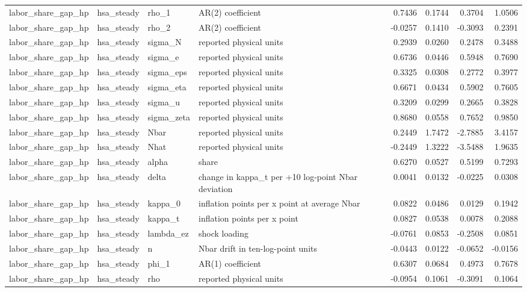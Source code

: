 \begin{tabular}{llllrrrr}
labor\_share\_gap\_hp & hsa\_steady & rho\_1 & AR(2) coefficient & 0.7436 & 0.1744 & 0.3704 & 1.0506 \\
labor\_share\_gap\_hp & hsa\_steady & rho\_2 & AR(2) coefficient & -0.0257 & 0.1410 & -0.3093 & 0.2391 \\
labor\_share\_gap\_hp & hsa\_steady & sigma\_N & reported physical units & 0.2939 & 0.0260 & 0.2478 & 0.3488 \\
labor\_share\_gap\_hp & hsa\_steady & sigma\_e & reported physical units & 0.6736 & 0.0446 & 0.5948 & 0.7690 \\
labor\_share\_gap\_hp & hsa\_steady & sigma\_eps & reported physical units & 0.3325 & 0.0308 & 0.2772 & 0.3977 \\
labor\_share\_gap\_hp & hsa\_steady & sigma\_eta & reported physical units & 0.6671 & 0.0434 & 0.5902 & 0.7605 \\
labor\_share\_gap\_hp & hsa\_steady & sigma\_u & reported physical units & 0.3209 & 0.0299 & 0.2665 & 0.3828 \\
labor\_share\_gap\_hp & hsa\_steady & sigma\_zeta & reported physical units & 0.8680 & 0.0558 & 0.7652 & 0.9850 \\
labor\_share\_gap\_hp & hsa\_steady & Nbar & reported physical units & 0.2449 & 1.7472 & -2.7885 & 3.4157 \\
labor\_share\_gap\_hp & hsa\_steady & Nhat & reported physical units & -0.2449 & 1.3222 & -3.5488 & 1.9635 \\
labor\_share\_gap\_hp & hsa\_steady & alpha & share & 0.6270 & 0.0527 & 0.5199 & 0.7293 \\
labor\_share\_gap\_hp & hsa\_steady & delta & change in kappa\_t per +10 log-point Nbar deviation & 0.0041 & 0.0132 & -0.0225 & 0.0308 \\
labor\_share\_gap\_hp & hsa\_steady & kappa\_0 & inflation points per x point at average Nbar & 0.0822 & 0.0486 & 0.0129 & 0.1942 \\
labor\_share\_gap\_hp & hsa\_steady & kappa\_t & inflation points per x point & 0.0827 & 0.0538 & 0.0078 & 0.2088 \\
labor\_share\_gap\_hp & hsa\_steady & lambda\_ez & shock loading & -0.0761 & 0.0853 & -0.2508 & 0.0851 \\
labor\_share\_gap\_hp & hsa\_steady & n & Nbar drift in ten-log-point units & -0.0443 & 0.0122 & -0.0652 & -0.0156 \\
labor\_share\_gap\_hp & hsa\_steady & phi\_1 & AR(1) coefficient & 0.6307 & 0.0684 & 0.4973 & 0.7678 \\
labor\_share\_gap\_hp & hsa\_steady & rho & reported physical units & -0.0954 & 0.1061 & -0.3091 & 0.1064 \\

\end{tabular}
